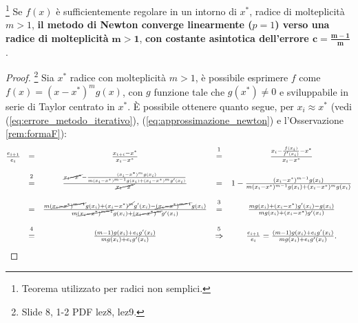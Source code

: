 \begin{theorem}\label{th:convLineareNewt}
	\footnote{Teorema utilizzato per radici non semplici.}
	Se $f(x)$ è sufficientemente regolare in un intorno di $x^*$, radice di molteplicità $m>1$, \textbf{il metodo di Newton converge linearmente ($p=1$) verso una radice di molteplicità} $\boldsymbol{m>1}$, \textbf{con costante asintotica dell'errore $\boldsymbol{c=\frac{m-1}{m}}$}.
\end{theorem}
\begin{proof}\footnote{Slide 8, 1-2 PDF lez8, lez9.}
	Sia $x^*$ radice con molteplicità $m>1$, è possibile esprimere $f$ come $f(x)=(x-x^*)^mg(x)$, con $g$ funzione tale che $g(x^*)\neq 0$ e sviluppabile in serie di Taylor centrato in $x^*$. È possibile ottenere quanto segue, per $x_i\approx x^*$ (vedi (\ref{eq:errore_metodo_iterativo}), (\ref{eq:approssimazione_newton}) e l'Osservazione \ref{rem:formaF}): 
	\begin{equation*}
		\begin{matrix}
			\frac{e_{i+1}}{e_i}&=&\frac{x_{i+i}-x^*}{x_i-x^*}&\overset{\footnotemark}{=}&\frac{x_i-\frac{f(x_i)}{f'(x_i)}-x^*}{x_i-x^*}\\\\
			&\overset{\footnotemark}{=}&\frac{\cancel{x_i-x^*}-\frac{(x_i-x^*)^mg(x_i)}{m{(x_i-x^*)^{m-1}}g(x_i)+(x_i-x^*)^mg'(x_i)}}{\cancel{x_i-x^*}}&=&1-\frac{(x_i-x^*)^{m-1}g(x_i)}{m(x_i-x^*)^{m-1}g(x_i)+(x_i-x^*)^mg(x_i)}\\\\
			&=&\frac{m(\cancel{x_i-x^*)^{m-1}}g(x_i)+(x_i-x^*)^{\cancel{m}}g'(x_i)-\cancel{(x_i-x^*)^{m-1}}g(x_i)}{m\cancel{(x_i-x^*)^{m-1}}g(x_i)+\cancel{(x_i-x^*)^m}g'(x_i)}&\overset{\footnotemark}{=}&\frac{mg(x_i)+(x_i-x^*)g'(x_i)-g(x_i)}{mg(x_i)+(x_i-x^*)g'(x_i)}\\\\
			&\overset{\footnotemark}{=}&\frac{(m-1)g(x_i)+e_ig'(x_i)}{mg(x_i)+e_ig'(x_i)}&\overset{\footnotemark}{\Rightarrow}&\frac{e_{i+1}}{e_i}=\frac{(m-1)g(x_i)+e_ig'(x_i)}{mg(x_i)+e_ig'(x_i)}.
		\end{matrix}
	\end{equation*}
	
	\addtocounter{footnote}{-4}
	
	
	

\end{proof}
